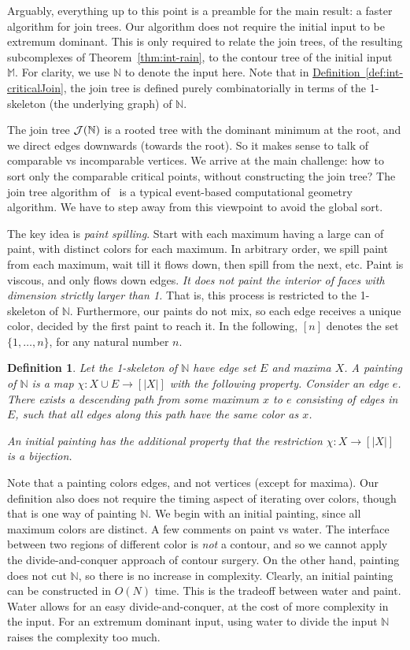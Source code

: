 \documentclass[11pt]{article}
\newtheorem{definition}[theorem]{Definition}
\theoremstyle{definition}
\newcommand{\cJ}{{\cal J}}
\newcommand{\MM}{\mathbb{M}}
\newcommand{\NN}{\mathbb{N}}
\newcommand{\Def}[1]{\hyperref[def:#1]{Definition~\ref*{def:#1}}} %
\begin{document}
{Arguably, everything up to this point is a preamble for the main result: a faster
algorithm for join trees. Our algorithm does not require the initial input to be extremum
dominant. This is only required to relate the join trees, of the resulting subcomplexes of Theorem~\ref{thm:int-rain}, to the contour tree of the initial input $\MM$.
For clarity, we use $\NN$ to denote the input here. Note that in \Def{int-criticalJoin},
the join tree is defined purely combinatorially in terms of the 1-skeleton (the underlying graph) of $\NN$.

The join tree $\cJ(\NN)$ is a rooted tree with the dominant minimum at the root, and we direct edges downwards (towards the root). So it makes sense to talk
of comparable vs incomparable vertices.
We arrive at the main challenge: how to sort only the comparable critical points, without
constructing the join tree? The join tree algorithm of~\cite{csa-cctad-03} is a typical event-based
computational geometry algorithm. We have to step away from this viewpoint to avoid the global sort.

The key idea is \emph{paint spilling}. Start with each maximum having a large can of paint, with distinct
colors for each maximum. In arbitrary order, we spill paint from each maximum, wait till it flows down,
then spill from the next, etc. Paint is viscous, and only flows down edges. \emph{It does not
paint the interior of faces with dimension strictly larger than 1.} That is, this process is restricted to the 1-skeleton of $\NN$.
Furthermore, our paints do not mix, so each edge receives a unique color, decided by the first
paint to reach it.  In the following, $[n]$ denotes the set $\{1, \ldots, n\}$, for any natural number $n$.

\begin{definition} \label{def:paint1} Let the 1-skeleton of $\NN$ have edge set $E$ and maxima $X$.
A  \emph{painting} of $\NN$ is a map $\chi:X \cup E \to [|X|]$ with the following property. 
 Consider an edge $e$. There exists a descending path from some maximum $x$ to $e$
	consisting of edges in $E$, such that all edges along this path have the same color as $x$. 

An \emph{initial} painting has the additional property that the restriction $\chi:X \to [|X|]$ is a bijection.
\end{definition}

Note that a painting colors edges, and not vertices (except for maxima). Our definition also does not require the timing aspect
of iterating over colors, though that is one way of painting $\NN$. We begin with an initial painting, since all maximum
colors are distinct. A few comments on paint vs water. The interface between two regions of different color
is \emph{not} a contour, and so we cannot apply the divide-and-conquer
approach of contour surgery. On the other hand, painting does not cut $\NN$, so there is no increase in complexity.
Clearly, an initial painting can be constructed in $O(N)$ time. This is the tradeoff between water and paint.
Water allows for an easy divide-and-conquer, at the cost of more complexity in the input. For an extremum
dominant input, using water to divide the input $\NN$ raises the complexity too much.

}
\end{document}
